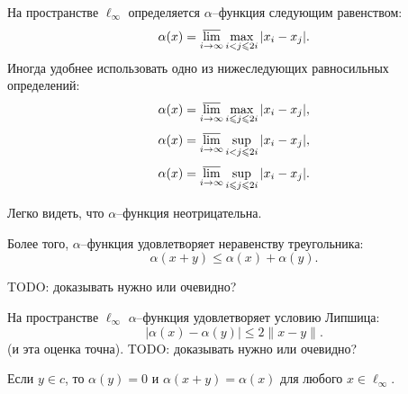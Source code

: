 На пространстве $\ell_\infty$ определяется $\alpha$--функция следующим равенством:
\begin{equation}
	\alpha(x) = \varlimsup_{i\to\infty} \max_{i<j\leqslant 2i} |x_i - x_j|
	.
\end{equation}
Иногда удобнее использовать одно из нижеследующих равносильных определений:
\begin{equation}
	\alpha(x) = \varlimsup_{i\to\infty} \max_{i \leqslant j\leqslant 2i} |x_i - x_j|
	,
\end{equation}
\begin{equation}
	\alpha(x) = \varlimsup_{i\to\infty} \sup_{i<j\leqslant 2i} |x_i - x_j|
	,
\end{equation}
\begin{equation}
	\alpha(x) = \varlimsup_{i\to\infty} \sup_{i \leqslant j\leqslant 2i} |x_i - x_j|
	.
\end{equation}

Легко видеть, что $\alpha$--функция неотрицательна.
\begin{property}
	Более того, $\alpha$--функция удовлетворяет неравенству треугольника:
	\begin{equation}
		\alpha(x+y) \leq \alpha(x) + \alpha(y)
		.
	\end{equation}
\end{property}
TODO: доказывать нужно или очевидно?

\begin{property}
	На пространстве $\ell_\infty$ $\alpha$--функция удовлетворяет условию Липшица:
	\begin{equation}\label{alpha_Lipshitz}
		|\alpha(x) - \alpha(y)| \leq 2 \|x-y\|
		.
	\end{equation}
	(и эта оценка точна).
	TODO: доказывать нужно или очевидно?
\end{property}

\begin{property}
	Если $y\in c$, то $\alpha(y) = 0$ и $\alpha(x+y) = \alpha(x)$ для любого $x \in \ell_\infty$.
\end{property}

